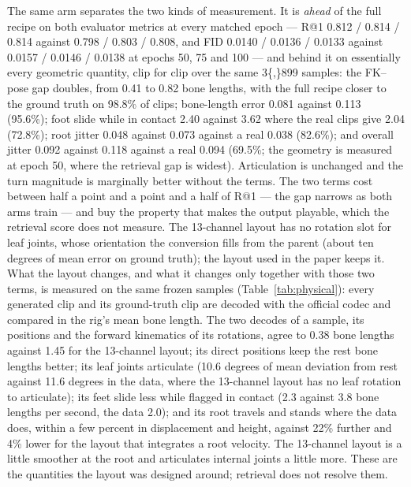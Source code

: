 The same arm separates the two kinds of measurement. It is \emph{ahead} of the full recipe on both
evaluator metrics at every matched
epoch --- R@1 \num{0.812} / \num{0.814} / \num{0.814} against \num{0.798} / \num{0.803} / \num{0.808},
and FID \num{0.0140} / \num{0.0136} / \num{0.0133} against \num{0.0157} / \num{0.0146} / \num{0.0138}
at epochs 50, 75 and 100 --- and behind it on
essentially every geometric quantity, clip for clip over the same \num{3{,}899} samples: the FK--pose
gap doubles, from \num{0.41} to \num{0.82} bone lengths, with the full recipe closer to the ground
truth on \num{98.8}\% of clips; bone-length error \num{0.081} against \num{0.113} (\num{95.6}\%);
foot slide while in contact \num{2.40} against \num{3.62} where the real clips give \num{2.04}
(\num{72.8}\%); root jitter \num{0.048} against \num{0.073} against a real \num{0.038}
(\num{82.6}\%); and overall jitter \num{0.092} against \num{0.118} against a real \num{0.094}
(\num{69.5}\%; the geometry is measured at epoch 50, where the retrieval gap is widest). Articulation is
unchanged and the turn magnitude is marginally better without the terms. The two terms cost between half
a point and a point and a half of R@1 --- the gap narrows as both arms train --- and buy the property
that makes the output playable, which the retrieval score does not measure. The 13-channel layout has no rotation slot for leaf joints,
whose orientation the conversion fills from the parent (about ten degrees of mean error on ground
truth); the layout used in the paper keeps it.
What the layout changes, and what it changes only together with those two terms, is measured on the same
frozen samples (Table~\ref{tab:physical}): every
generated clip and its ground-truth clip are decoded with the official codec and compared in the rig's mean
bone length. The two decodes of a \rep{} sample, its positions and the forward kinematics of its rotations,
agree to \num{0.38} bone lengths against \num{1.45} for the 13-channel layout; its direct positions keep the
rest bone lengths better; its leaf joints articulate (\num{10.6} degrees of mean deviation from rest against
\num{11.6} degrees in the data, where the 13-channel layout has no leaf rotation to articulate); its feet
slide less while flagged in contact (\num{2.3} against \num{3.8} bone lengths per second, the data \num{2.0});
and its root travels and stands where the data does, within a few percent in displacement and height, against
\num{22}\% further and \num{4}\% lower for the layout that integrates a root velocity. The
13-channel layout is a little smoother at the root and articulates internal joints a little more. These are
the quantities the layout was designed around; retrieval does not resolve them.

